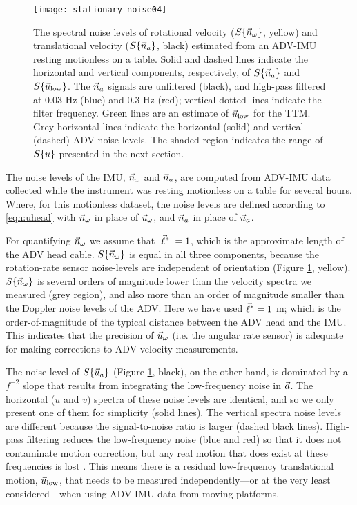 \begin{figure}
  \centering
  \texttt{[image: stationary\_noise04]}
  \caption{The spectral noise levels of rotational velocity ($S\{\vec{n}_{\omega}\}$, yellow) and translational velocity ($S\{\vec{n}_{a}\}$, black) estimated from an ADV-IMU resting motionless on a table. Solid and dashed lines indicate the horizontal and vertical components, respectively, of $S\{\vec{n}_{a}\}$ and $S\{\vec{u}_\mathrm{low}\}$. The $\vec{n}_{a}$ signals are unfiltered (black), and high-pass filtered at 0.03 Hz (blue) and 0.3 Hz (red); vertical dotted lines indicate the filter frequency.  Green lines are an estimate of $\vec{u}_\mathrm{low}$ for the TTM. Grey horizontal lines indicate the horizontal (solid) and vertical (dashed) ADV noise levels. The shaded region indicates the range of $S\{u\}$ presented in the next section.}
  \label{fig:stnoise}
\end{figure}

The noise levels of the IMU, $\vec{n}_{\omega}$ and $\vec{n}_{a}$, are computed from ADV-IMU data collected while the instrument was resting motionless on a table for several hours. Where, for this motionless dataset, the noise levels are defined according to \eqref{eqn:uhead} with $\vec{n}_{\omega}$ in place of $\vec{u}_\omega$, and $\vec{n}_{a}$ in place of $\vec{u}_a$.  

For quantifying $\vec{n}_{\omega}$ we assume that $|\vec{\ell}^*| = 1$, which is the approximate length of the ADV head cable. $S\{\vec{n}_{\omega}\}$ is equal in all three components, because the rotation-rate sensor noise-levels are independent of orientation (Figure \ref{fig:stnoise}, yellow). $S\{\vec{n}_{\omega}\}$ is several orders of magnitude lower than the velocity spectra we measured (grey region), and also more than an order of magnitude smaller than the Doppler noise levels of the ADV. Here we have used $\vec{\ell}^*=1$ m; which is the order-of-magnitude of the typical distance between the ADV head and the IMU. This indicates that the precision of $\vec{u}_\omega$ (i.e. the angular rate sensor) is adequate for making corrections to ADV velocity measurements.

The noise level of $S\{\vec{u}_a\}$ (Figure \ref{fig:stnoise}, black), on the other hand, is dominated by a $f^{-2}$ slope that results from integrating the low-frequency noise in ${\vec{a}}$. The horizontal ($u$ and $v$) spectra of these noise levels are identical, and so we only present one of them for simplicity (solid lines). The vertical spectra noise levels are different because the signal-to-noise ratio is larger (dashed black lines). High-pass filtering reduces the low-frequency noise (blue and red) so that it does not contaminate motion correction, but any real motion that does exist at these frequencies is lost \cite[]{EgelandPhD2014, VanZwieten++2015}. This means there is a residual low-frequency translational motion, $\vec{u}_\mathrm{low}$, that needs to be measured independently---or at the very least considered---when using ADV-IMU data from moving platforms. 

